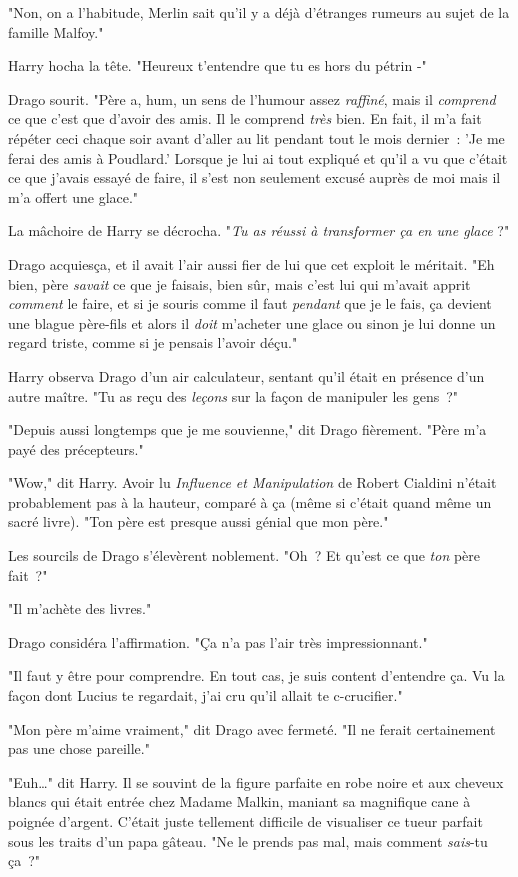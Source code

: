 "Non, on a l'habitude, Merlin sait qu'il y a déjà d'étranges rumeurs au sujet de la famille Malfoy."

Harry hocha la tête. "Heureux t'entendre que tu es hors du pétrin -"

Drago sourit. "Père a, hum, un sens de l'humour assez \emph{raffiné}, mais il \emph{comprend} ce que c'est que d'avoir des amis. Il le comprend \emph{très} bien. En fait, il m'a fait répéter ceci chaque soir avant d'aller au lit pendant tout le mois dernier~: 'Je me ferai des amis à Poudlard.' Lorsque je lui ai tout expliqué et qu'il a vu que c'était ce que j'avais essayé de faire, il s'est non seulement excusé auprès de moi mais il m'a offert une glace."

La mâchoire de Harry se décrocha. "\emph{Tu as réussi à transformer ça en une glace} ?"

Drago acquiesça, et il avait l'air aussi fier de lui que cet exploit le méritait. "Eh bien, père \emph{savait} ce que je faisais, bien sûr, mais c'est lui qui m'avait apprit \emph{comment} le faire, et si je souris comme il faut \emph{pendant} que je le fais, ça devient une blague père-fils et alors il \emph{doit} m'acheter une glace ou sinon je lui donne un regard triste, comme si je pensais l'avoir déçu."

Harry observa Drago d'un air calculateur, sentant qu'il était en présence d'un autre maître. "Tu as reçu des \emph{leçons} sur la façon de manipuler les gens~?"

"Depuis aussi longtemps que je me souvienne," dit Drago fièrement. "Père m'a payé des précepteurs."

"Wow," dit Harry. Avoir lu \emph{Influence et Manipulation} de Robert Cialdini n'était probablement pas à la hauteur, comparé à ça (même si c'était quand même un sacré livre). "Ton père est presque aussi génial que mon père."

Les sourcils de Drago s'élevèrent noblement. "Oh~? Et qu'est ce que \emph{ton} père fait~?"

"Il m'achète des livres."

Drago considéra l'affirmation. "Ça n'a pas l'air très impressionnant."

"Il faut y être pour comprendre. En tout cas, je suis content d'entendre ça. Vu la façon dont Lucius te regardait, j'ai cru qu'il allait te c-crucifier."

"Mon père m'aime vraiment," dit Drago avec fermeté. "Il ne ferait certainement pas une chose pareille."

"Euh…" dit Harry. Il se souvint de la figure parfaite en robe noire et aux cheveux blancs qui était entrée chez Madame Malkin, maniant sa magnifique cane à poignée d'argent. C'était juste tellement difficile de visualiser ce tueur parfait sous les traits d'un papa gâteau. "Ne le prends pas mal, mais comment \emph{sais}-tu ça~?"

